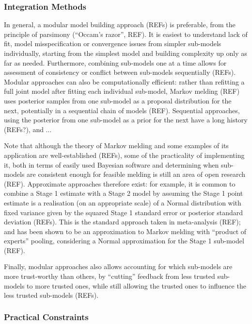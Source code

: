 \documentclass{article}
\begin{document}
\subsubsection{Integration Methods}
In general, a modular model building approach (REFs) is preferable, from the principle of parsimony (``Occam's razor'', REF). It is easiest to understand lack of fit, model misspecification or convergence issues from simpler sub-models individually, starting from the simplest model and building complexity up only as far as needed. Furthermore, combining sub-models one at a time allows for assessment of consistency or conflict between sub-models sequentially (REFs). Modular approaches can also be computationally efficient: rather than refitting a full joint model after fitting each individual sub-model, Markov melding (REF) uses posterior samples from one sub-model as a proposal distribution for the next, potentially in a sequential chain of models (REF). Sequential approaches, using the posterior from one sub-model as a prior for the next have a long history (REFs?), and ... 

Note that although the theory of Markov melding and some examples of its application are well-established (REFs), some of the practicality of implementing it, both in terms of easily used Bayesian software and determining when sub-models are consistent enough for feasible melding is still an area of open research (REF). Approximate approaches therefore exist: for example, it is common to combine a Stage 1 estimate with a Stage 2 model by assuming the Stage 1 point estimate is a realisation (on an appropriate scale) of a Normal distribution with fixed variance given by the squared Stage 1 standard error or posterior standard deviation (REFs). This is the standard approach taken in meta-analysis (REF); and has been shown to be an approximation to Markov melding with ``product of experts'' pooling, considering a Normal approximation for the Stage 1 sub-model (REF).

Finally, modular approaches also allows accounting for which sub-models are more trust-worthy than others, by ``cutting'' feedback from less trusted sub-models to more trusted ones, while still allowing the trusted ones to influence the less trusted sub-models (REFs).



\subsubsection{Practical Constraints}
\end{document}
